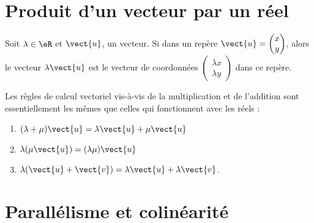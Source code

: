 
\section{Produit d'un vecteur par un réel}

\begin{definition}
    Soit \( \lambda\in \eR\) et \( \vect{ u }\), un vecteur. Si dans un repère \( \vect{ u }=\begin{pmatrix}
        x    \\ 
        y    
    \end{pmatrix}\), alors le vecteur \( \lambda\vect{ u }\) est le vecteur de coordonnées \( \begin{pmatrix}
        \lambda x    \\ 
        \lambda y    
    \end{pmatrix}\) dans ce repère.
\end{definition}

\begin{Aretenir}
    Les règles de calcul vectoriel vis-à-vis de la multiplication et de l'addition sont essentiellement les mêmes que celles qui fonctionnent avec les réels :
    \begin{enumerate}
        \item
            \( (\lambda+\mu)\vect{ u }=\lambda\vect{ u }+\mu\vect{ u }\)
        \item
            \( \lambda(\mu\vect{ u })=(\lambda\mu)\vect{ u }\)
        \item
            \( \lambda(\vect{ u }+\vect{ v })=\lambda\vect{ u }+\lambda\vect{ v }\).
    \end{enumerate}
\end{Aretenir}

\section{Parallélisme et colinéarité}


